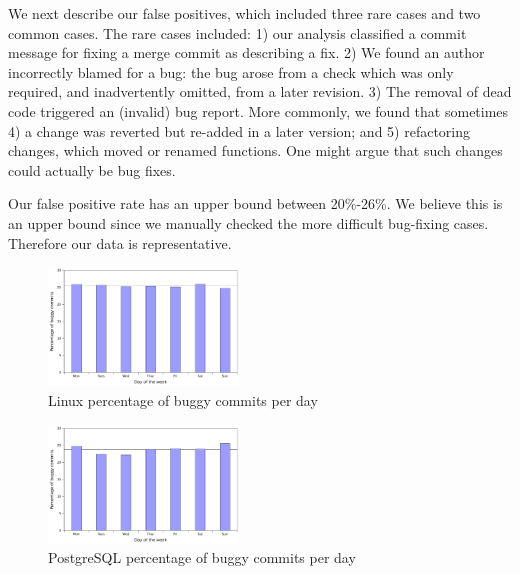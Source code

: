 We next describe our false positives, which included three rare cases
and two common cases. The rare cases included: 1) our analysis
classified a commit message for fixing a merge commit as describing a
fix. 2) We found an author incorrectly blamed for a bug: the bug arose
from a check which was only required, and inadvertently omitted, from
a later revision. 3) The removal of dead code triggered an (invalid)
bug report. More commonly, we found that sometimes 4) a change was
reverted but re-added in a later version; and 5) refactoring changes,
which moved or renamed functions. One might argue that such changes
could actually be bug fixes.

 
Our false positive rate has an upper bound between 20\%-26\%. We
believe this is an upper bound since we manually checked the more
difficult bug-fixing cases. Therefore our data is representative.

\begin{figure}
\begin{center}
\includegraphics[width=0.45\textwidth]{linux-bugginess-day.pdf}
\end{center}
\caption{Linux percentage of buggy commits per day}
\label{fig-linux-bugginess-day}
\end{figure}

\begin{figure}
\begin{center}
\includegraphics[width=0.45\textwidth]{postgresql-bugginess-day.pdf}
\end{center}
\caption{PostgreSQL percentage of buggy commits per day}
\label{fig-postgresql-bugginess-day}
\end{figure}

